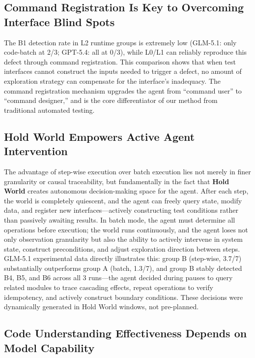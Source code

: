\documentclass[sigconf,nonacm]{acmart}
\begin{document}
\subsection{Command Registration Is Key to Overcoming Interface Blind Spots}

The B1 detection rate in L2 runtime groups is extremely low (GLM-5.1: only code-batch at 2/3; GPT-5.4: all at 0/3), while L0/L1 can reliably reproduce this defect through command registration. This comparison shows that when test interfaces cannot construct the inputs needed to trigger a defect, no amount of exploration strategy can compensate for the interface's inadequacy. The command registration mechanism upgrades the agent from ``command user'' to ``command designer,'' and is the core differentiator of our method from traditional automated testing.

\subsection{Hold World Empowers Active Agent Intervention}

The advantage of step-wise execution over batch execution lies not merely in finer granularity or causal traceability, but fundamentally in the fact that \textbf{Hold World} creates autonomous decision-making space for the agent. After each step, the world is completely quiescent, and the agent can freely query state, modify data, and register new interfaces---actively constructing test conditions rather than passively awaiting results. In batch mode, the agent must determine all operations before execution; the world runs continuously, and the agent loses not only observation granularity but also the ability to actively intervene in system state, construct preconditions, and adjust exploration direction between steps. GLM-5.1 experimental data directly illustrates this: group B (step-wise, 3.7/7) substantially outperforms group A (batch, 1.3/7), and group B stably detected B4, B5, and B6 across all 3 runs---the agent decided during pauses to query related modules to trace cascading effects, repeat operations to verify idempotency, and actively construct boundary conditions. These decisions were dynamically generated in Hold World windows, not pre-planned.

\subsection{Code Understanding Effectiveness Depends on Model Capability}
\end{document}
